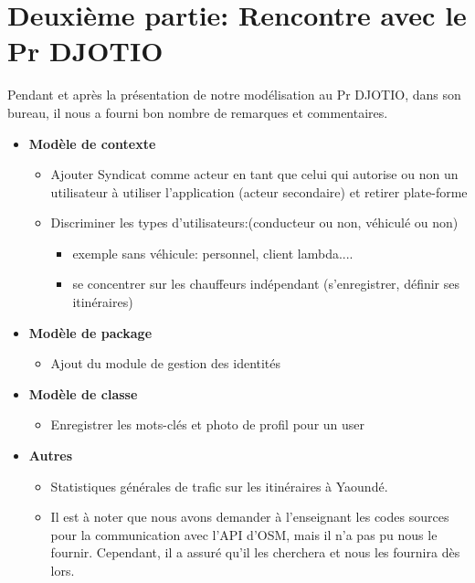 \documentclass[12px]{article}
\begin{document}
\section{Deuxième partie: Rencontre avec le Pr DJOTIO}
Pendant et après la présentation de notre modélisation au Pr DJOTIO, dans son bureau, il nous a fourni bon nombre de remarques et commentaires.
\begin{itemize}
    \item \textbf{Modèle de contexte}
    \begin{itemize}
        \item Ajouter Syndicat comme acteur en tant que celui qui autorise ou non un utilisateur à utiliser l'application (acteur secondaire) et retirer plate-forme
        \item Discriminer les types d'utilisateurs:(conducteur ou non, véhiculé ou non)
        \begin{itemize}
            \item exemple sans véhicule: personnel, client lambda....
            \item se concentrer sur les chauffeurs indépendant (s'enregistrer, définir ses itinéraires)
        \end{itemize}
    \end{itemize}
    \item \textbf{Modèle de package}
    \begin{itemize}
        \item Ajout du module de gestion des identités
    \end{itemize}
    \item \textbf{Modèle de classe}
    \begin{itemize}
        \item Enregistrer les mots-clés et photo de profil pour un user
    \end{itemize}
    \item \textbf{Autres}
    \begin{itemize}
        \item Statistiques générales de trafic sur les itinéraires à Yaoundé.
        \item Il est à noter que nous avons demander à l'enseignant les codes sources pour la communication avec l'API d'OSM, mais il n'a pas pu nous le fournir. Cependant, il a assuré qu'il les cherchera et nous les fournira dès lors.
    \end{itemize}
\end{itemize}
\end{document}
